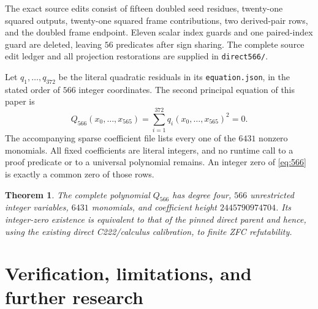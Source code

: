 \documentclass[11pt]{article}
\newcommand{\file}[1]{\nolinkurl{#1}}
\newtheorem{theorem}{Theorem}[section]
\theoremstyle{definition}\newtheorem{definition}[theorem]{Definition}
\theoremstyle{remark}\newtheorem{remark}[theorem]{Remark}
\begin{document}
The exact source edits consist of fifteen doubled seed residues,
twenty-one squared outputs, twenty-one squared frame contributions,
two derived-pair rows, and the doubled frame endpoint. Eleven scalar
index guards and one paired-index guard are deleted, leaving $56$
predicates after sign sharing. The complete source edit ledger and all
projection restorations are supplied in \file{direct566/}.

Let $q_1,\ldots,q_{372}$ be the literal quadratic residuals in its
\file{equation.json}, in the stated order of $566$ integer coordinates.
The second principal equation of this paper is
\begin{equation}\label{eq:566}
 \boxed{Q_{566}(x_0,\ldots,x_{565})=
              \sum_{i=1}^{372}q_i(x_0,\ldots,x_{565})^2=0.}
\end{equation}
The accompanying sparse coefficient file lists every one of the $6431$
nonzero monomials. All fixed coefficients are literal integers, and no
runtime call to a proof predicate or to a universal polynomial remains.
An integer zero of \eqref{eq:566} is exactly a common zero of those rows.

\begin{theorem}
The complete polynomial $Q_{566}$ has degree four, $566$ unrestricted
integer variables, $6431$ monomials, and coefficient height
$2445790974704$. Its integer-zero existence is equivalent to that of
the pinned direct parent and hence, using the existing direct
C222/calculus calibration, to finite ZFC refutability.
\end{theorem}

\section{Verification, limitations, and further research}
\end{document}
